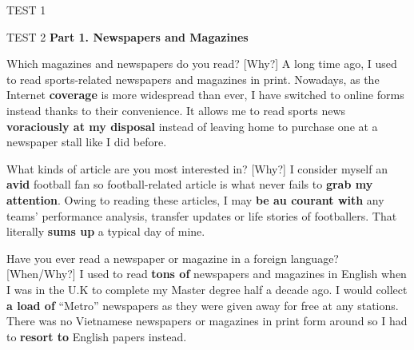 \begin{glossarymc}[Cambridge 8]
\begin{test}{TEST 1}
\begin{VocabHighlights}
    \end{VocabHighlights}
    \end{test}

    \begin{test}{TEST 2}
    \noindent
    \textbf{Part 1. Newspapers and Magazines}
    \begin{qa}{Which magazines and newspapers do you read? [Why?]}
    A long time ago, I used to read sports-related newspapers and magazines in print. Nowadays, as the Internet \textbf{coverage} is more widespread than ever, I have switched to online forms instead thanks to their convenience. It allows me to read sports news \textbf{voraciously at my disposal} instead of leaving home to purchase one at a newspaper stall like I did before.
    \end{qa}

    \begin{qa}{What kinds of article are you most interested in? [Why?]}
    I consider myself an \textbf{avid} football fan so football-related article is what never fails to \textbf{grab my attention}. Owing to reading these articles, I may \textbf{be au courant with} any teams’ performance analysis, transfer updates or life stories of footballers. That literally \textbf{sums up} a typical day of mine.
    \end{qa}

    \begin{qa}{Have you ever read a newspaper or magazine in a foreign language? [When/Why?]}
    I used to read \textbf{tons of} newspapers and magazines in English when I was in the U.K to complete my Master degree half a decade ago. I would collect \textbf{a load of} “Metro” newspapers as they were given away for free at any stations. There was no Vietnamese newspapers or magazines in print form around so I had to \textbf{resort to} English papers instead.
    \end{qa}


\end{test}
\end{glossarymc}

